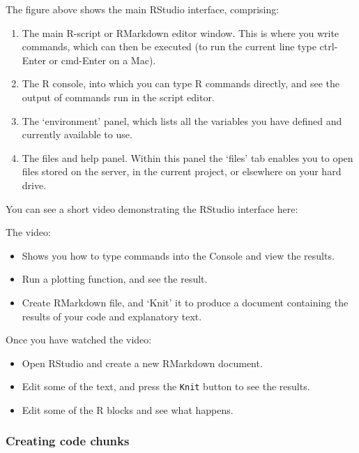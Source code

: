 \documentclass[]{article}
\providecommand{\tightlist}{%
  \setlength{\itemsep}{0pt}\setlength{\parskip}{0pt}}
\begin{document}
The figure above shows the main RStudio interface, comprising:

\begin{enumerate}
\def\labelenumi{\arabic{enumi}.}
\item
  The main R-script or RMarkdown editor window. This is where you write
  commands, which can then be executed (to run the current line type ctrl-Enter
  or cmd-Enter on a Mac).
\item
  The R console, into which you can type R commands directly, and see the
  output of commands run in the script editor.
\item
  The `environment' panel, which lists all the variables you have defined and
  currently available to use.
\item
  The files and help panel. Within this panel the `files' tab enables you to
  open files stored on the server, in the current project, or elsewhere on your
  hard drive.
\end{enumerate}

You can see a short video demonstrating the RStudio interface here:

The video:

\begin{itemize}
\tightlist
\item
  Shows you how to type commands into the Console and view the results.
\item
  Run a plotting function, and see the result.
\item
  Create RMarkdown file, and `Knit' it to produce a document containing the
  results of your code and explanatory text.
\end{itemize}

Once you have watched the video:

\begin{itemize}
\tightlist
\item
  Open RStudio and create a new RMarkdown document.
\item
  Edit some of the text, and press the \texttt{Knit} button to see the results.
\item
  Edit some of the R blocks and see what happens.
\end{itemize}

\hypertarget{creating-code-chunks}{%
\subsubsection*{Creating code chunks}\label{creating-code-chunks}}
\end{document}
